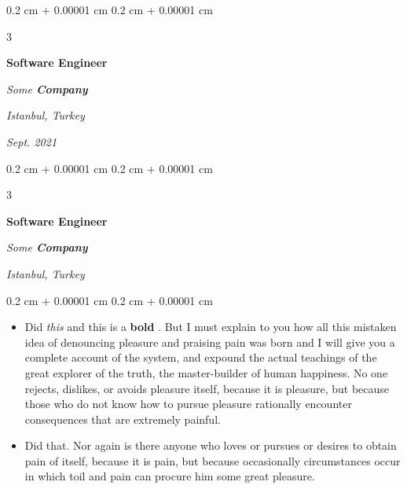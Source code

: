 \documentclass[10pt, letterpaper]{article}
\newenvironment{highlights}{
    \begin{itemize}[
        topsep=0.10 cm,
        parsep=0.10 cm,
        partopsep=0pt,
        itemsep=0pt,
        leftmargin=0.4 cm + 10pt + 0.6 cm
    ]
}{
    \end{itemize}
} %
\newenvironment{onecolentry}{
    \begin{adjustwidth}{
        0.2 cm + 0.00001 cm
    }{
        0.2 cm + 0.00001 cm
    }
}{
    \end{adjustwidth}
} %
\newenvironment{threecolentry}[3][]{
    \onecolentry
    \def\thirdColumn{#3}
    \setcolumnwidth{0.6 cm, \fill, 4.5 cm}
    \begin{paracol}{3}
    #2 \switchcolumn
}{
    \switchcolumn \raggedleft \thirdColumn
    \end{paracol}
    \endonecolentry
} %
\let\hrefWithoutArrow\href
\renewcommand{\href}[2]{\hrefWithoutArrow{#1}{\mbox{\ifthenelse{\equal{#2}{}}{ }{#2 }\raisebox{.15ex}{\footnotesize \faExternalLink*}}}}
\begin{document}
        \vspace{0.2 cm-3px}

        \begin{threecolentry}{
            \vspace*{\fill}
            \textbullet
            \vspace*{3px}
            \vspace*{\fill}
        }{
        \textit{Istanbul, Turkey}    
            
        \textit{Sept. 2021}}
            \textbf{Software Engineer}
            
            \textit{Some \textbf{Company}}
        \end{threecolentry}



        \vspace{0.2 cm-3px}

        \begin{threecolentry}{
            \vspace*{\fill}
            \textbullet
            \vspace*{3px}
            \vspace*{\fill}
        }{
        \textit{Istanbul, Turkey}    
            
        }
            \textbf{Software Engineer}
            
            \textit{Some \textbf{Company}}
        \end{threecolentry}

        \vspace{0.10 cm-3px}
        \begin{onecolentry}
            \begin{highlights}
                \item Did \textit{this} and this is a \textbf{bold} \href{https://example.com}{link}. But I must explain to you how all this mistaken idea of denouncing pleasure and praising pain was born and I will give you a complete account of the system, and expound the actual teachings of the great explorer of the truth, the master-builder of human happiness. No one rejects, dislikes, or avoids pleasure itself, because it is pleasure, but because those who do not know how to pursue pleasure rationally encounter consequences that are extremely painful.
                \item Did that. Nor again is there anyone who loves or pursues or desires to obtain pain of itself, because it is pain, but because occasionally circumstances occur in which toil and pain can procure him some great pleasure.
            \end{highlights}
        \end{onecolentry}
\end{document}

